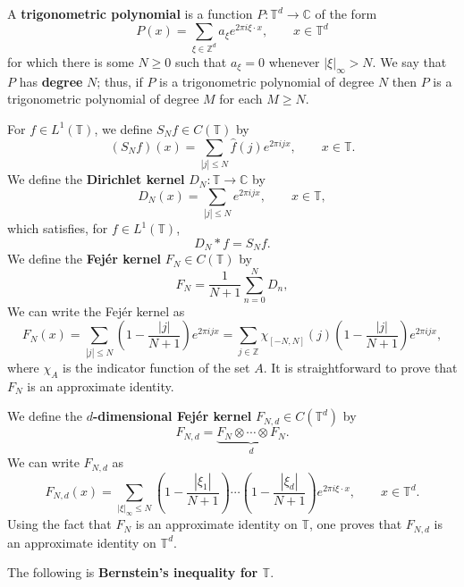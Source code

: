 \documentclass{article}
\theoremstyle{definition}
\begin{document}
A \textbf{trigonometric polynomial} is a function $P:\mathbb{T}^d \to \mathbb{C}$ of the form
\[
P(x) = \sum_{\xi \in \mathbb{Z}^d} a_\xi e^{2\pi i\xi \cdot x}, \qquad x \in \mathbb{T}^d
\]
for which there is some $N \geq 0$ such that $a_\xi=0$ whenever $|\xi|_\infty>N$. We say that $P$ has \textbf{degree} $N$; thus,
if $P$ is a trigonometric polynomial of degree $N$ then $P$ is a trigonometric polynomial of degree $M$ for each $M \geq N$.

For $f \in L^1(\mathbb{T})$, we define $S_N f \in C(\mathbb{T})$ by
\[
(S_N f)(x) = \sum_{|j| \leq N} \hat{f}(j) e^{2\pi ijx}, \qquad x \in \mathbb{T}.
\]
We define the \textbf{Dirichlet kernel} $D_N:\mathbb{T} \to \mathbb{C}$ by
\[
D_N(x) = \sum_{|j| \leq N}  e^{2\pi ijx}, \qquad x \in \mathbb{T},
\]
which satisfies, for $f \in L^1(\mathbb{T})$,
\[
D_N * f = S_N f.
\]
We define the \textbf{Fej\'er kernel} $F_N \in C(\mathbb{T})$ by
\[
F_N = \frac{1}{N+1} \sum_{n=0}^N D_n,
\]
We can write the Fej\'er kernel as 
\[
F_N (x) = \sum_{|j| \leq N} \left(1-\frac{|j|}{N+1}\right) e^{2\pi ijx}
=\sum_{j \in \mathbb{Z}} \chi_{[-N,N]}(j) \left(1-\frac{|j|}{N+1}\right) e^{2\pi ijx},
\]
where $\chi_A$ is the indicator function of the set $A$.
It is straightforward to prove that $F_N$ is an approximate identity.

 We define the \textbf{$d$-dimensional Fej\'er kernel} $F_{N,d} \in C(\mathbb{T}^d)$ by
 \[
 F_{N,d} = \underbrace{F_N \otimes \cdots \otimes F_N}_{d}.
 \]
 We can write $F_{N,d}$ as
 \[
 F_{N,d}(x) = \sum_{|\xi|_\infty \leq N} \left(1-\frac{|\xi_1|}{N+1}\right)\cdots
 \left(1-\frac{|\xi_d|}{N+1}\right) e^{2\pi i\xi \cdot x},\qquad x \in \mathbb{T}^d.
 \]
 Using the fact that $F_N$ is an approximate identity on $\mathbb{T}$, one proves that
 $F_{N,d}$ is an approximate identity on $\mathbb{T}^d$. 
  


The following is \textbf{Bernstein's inequality for
$\mathbb{T}$}.
\end{document}
